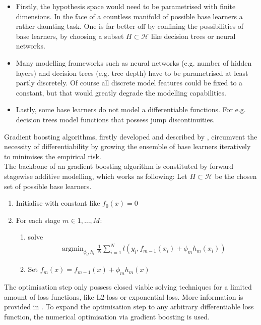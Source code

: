 \documentclass[a4paper, 11pt]{article}
\DeclareMathOperator*{\argmin}{argmin} %
\begin{document}
\begin{itemize}
\item Firstly, the hypothesis space would need to be parametrised with finite dimensions. In the face of a countless manifold of possible base learners a rather daunting task. One is far better off by confining the possibilities of base learners, by choosing a subset $H \subset \mathcal{H}$ like decision trees or neural networks.

\item Many modelling frameworks such as neural networks (e.g. number of hidden layers) and decision trees (e.g. tree depth) have to be parametrised at least partly discretely. Of course all discrete model features could be fixed to a constant, but that would greatly degrade the modelling capabilities.

\item Lastly, some base learners do not model a differentiable functions. For e.g. decision trees model functions that possess jump discontinuities.

\end{itemize}

Gradient boosting algorithms, firstly developed and described by \cite{freund1997decision, friedman2001greedy, friedman2002stochastic}, circumvent the necessity of differentiability by growing the ensemble of base learners iteratively to minimises the empirical risk.\\
The backbone of an gradient boosting algorithm is constituted by forward stagewise additive modelling, which works as following:
Let $H \subset \mathcal{H}$ be the chosen set of possible base learners.

\begin{enumerate}
\item Initialise with constant like $f_0(x) = 0$
\item For each stage $m \in 1,\ldots,M$:
\begin{enumerate}
\item solve \begin{align*}
\argmin_{\phi_i, h_i}\frac{1}{N}\sum_{i = 1}^{N} l(y_i,f_{m-1}(x_i) + \phi_m h_m(x_i))
\end{align*}
\item Set $f_m(x) = f_{m-1}(x) + \phi_m h_m(x)$
\end{enumerate}
\end{enumerate}

The optimisation step only possess closed viable solving techniques for a limited amount of loss functions, like L2-loss or exponential loss. More information is provided in \cite{friedman2000additive}. To expand the optimisation step to any arbitrary differentiable loss function, the numerical optimisation via gradient boosting is used. \\
\end{document}

